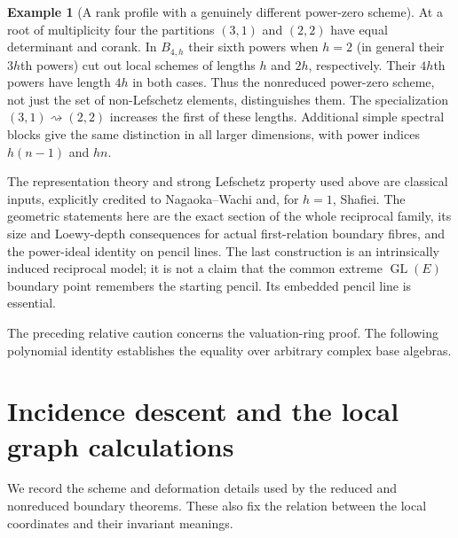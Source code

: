 \documentclass[11pt,reqno]{amsart}
\numberwithin{equation}{section}
\theoremstyle{definition}\newtheorem{definition}[theorem]{Definition}
\newtheorem{example}[theorem]{Example}
\theoremstyle{remark}\newtheorem{remark}[theorem]{Remark}
\begin{document}
\begin{example}[A rank profile with a genuinely different power-zero scheme]
\label{ex:power-profile-v155}
At a root of multiplicity four the partitions $(3,1)$ and $(2,2)$
have equal determinant and corank.  In $B_{4,h}$ their sixth powers
when $h=2$ (in general their $3h$th powers) cut out local schemes
of lengths $h$ and $2h$, respectively.  Their $4h$th powers have
length $4h$ in both cases.  Thus the nonreduced power-zero scheme,
not just the set of non-Lefschetz elements, distinguishes them.
The specialization $(3,1)\rightsquigarrow(2,2)$ increases the first
of these lengths.  Additional simple spectral blocks give the
same distinction in all larger dimensions, with power indices
$h(n-1)$ and $hn$.
\end{example}

The representation theory and strong Lefschetz property used above
are classical inputs, explicitly credited to Nagaoka--Wachi and,
for $h=1$, Shafiei.  The geometric statements here are the exact
section of the whole reciprocal family, its size and Loewy-depth
consequences for actual first-relation boundary fibres, and the
power-ideal identity on pencil lines.  The last construction is an
intrinsically induced reciprocal model; it is not a claim that the
common extreme $\operatorname{GL}(E)$ boundary point remembers the
starting pencil.  Its embedded pencil line is essential.

The preceding relative caution concerns the valuation-ring proof. The following polynomial identity establishes the equality over arbitrary complex base algebras.


\section{Incidence descent and the local graph calculations}
\label{sec:technical-completions-v162}
We record the scheme and deformation details used by the reduced and
nonreduced boundary theorems. These also fix the relation between the
local coordinates and their invariant meanings.
\end{document}
